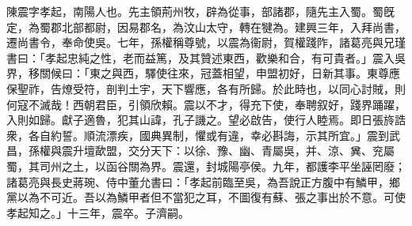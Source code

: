 \begin{pinyinscope}
 
 
 陳震字孝起，南陽人也。先主領荊州牧，辟為從事，部諸郡，隨先主入蜀。蜀旣定，為蜀郡北部都尉，因易郡名，為汶山太守，轉在犍為。建興三年，入拜尚書，遷尚書令，奉命使吳。七年，孫權稱尊號，以震為衞尉，賀權踐阼，諸葛亮與兄瑾書曰：「孝起忠純之性，老而益篤，及其贊述東西，歡樂和合，有可貴者。」震入吳界，移關候曰：「東之與西，驛使往來，冠蓋相望，申盟初好，日新其事。東尊應保聖祚，告燎受符，剖判土宇，天下響應，各有所歸。於此時也，以同心討賊，則何寇不滅哉！西朝君臣，引領欣賴。震以不才，得充下使，奉聘叙好，踐界踊躍，入則如歸。獻子適魯，犯其山諱，孔子譏之。望必啟告，使行人睦焉。即日張旍誥衆，各自約誓。順流漂疾，國典異制，懼或有違，幸必斟誨，示其所宜。」震到武昌，孫權與震升壇歃盟，交分天下：以徐、豫、幽、青屬吳，并、涼、兾、兖屬蜀，其司州之土，以函谷關為界。震還，封城陽亭侯。九年，都護李平坐誣罔廢；諸葛亮與長史蔣琬、侍中董允書曰：「孝起前臨至吳，為吾說正方腹中有鱗甲，鄉黨以為不可近。吾以為鱗甲者但不當犯之耳，不圖復有蘇、張之事出於不意。可使孝起知之。」十三年，震卒。子濟嗣。
 
 
\end{pinyinscope}